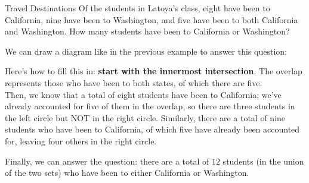 \begin{example}[https://www.youtube.com/watch?v=L02esvvq8W0&list=PLfmpjsIzhztuvrh-T2Owgo_gO84qypSBG&index=22]{Travel Destinations}
Of the students in Latoya's class, eight have been to California, nine have been to Washington, and five have been to both California and Washington.  How many students have been to California or Washington?

\sol
We can draw a diagram like in the previous example to answer this question:

\begin{center}
\end{center}

Here's how to fill this in: \textbf{start with the innermost intersection}.  The overlap represents those who have been to both states, of which there are five.\\

Then, we know that a total of eight students have been to California; we've already accounted for five of them in the overlap, so there are three students in the left circle but NOT in the right circle.  Similarly, there are a total of nine students who have been to California, of which five have already been accounted for, leaving four others in the right circle.

\begin{center}
\end{center}

Finally, we can answer the question: there are a total of $\boxed{12}$ students (in the union of the two sets) who have been to either California or Washington.

\end{example}

